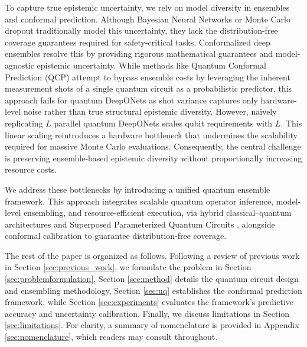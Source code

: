\documentclass{iopjournal}
\begin{document}
To capture true epistemic uncertainty, we rely on model diversity in ensembles and conformal prediction. Although Bayesian Neural Networks \cite{neal1996bnn, goan2020bnn} or Monte Carlo dropout \cite{gal2016dropout} traditionally model this uncertainty, they lack the distribution-free coverage guarantees required for safety-critical tasks. Conformalized deep ensembles \cite{angelopoulous2023conformal, moya2025conformal} resolve this by providing rigorous mathematical guarantees and model-agnostic epistemic uncertainty. While methods like Quantum Conformal Prediction (QCP) \cite{park2023qcp} attempt to bypass ensemble costs by leveraging the inherent measurement shots of a single quantum circuit as a probabilistic predictor, this approach fails for quantum DeepONets as shot variance captures only hardware-level noise rather than true structural epistemic diversity. However, naïvely replicating $L$ parallel quantum DeepONets scales qubit requirements with $L$. This linear scaling reintroduces a hardware bottleneck that undermines the scalability required for massive Monte Carlo evaluations. Consequently, the central challenge is preserving ensemble-based epistemic diversity without proportionally increasing resource costs.

We address these bottlenecks by introducing a unified quantum ensemble framework. This approach integrates scalable quantum operator inference, model-level ensembling, and resource-efficient execution, via hybrid classical–quantum architectures and Superposed Parameterized Quantum Circuits \cite{patapovich2025spqc}, alongside conformal calibration to guarantee distribution-free coverage. 

The rest of the paper is organized as follows. Following a review of previous work in Section \ref{sec:previous_work}, we formulate the problem in Section \ref{sec:problemformulation}, Section \ref{sec:method} details the quantum circuit design and ensembling methodology, Section \ref{sec:uq} establishes the conformal prediction framework, while Section \ref{sec:experiments} evaluates the framework's predictive accuracy and uncertainty calibration. Finally, we discuss limitations in Section \ref{sec:limitations}. For clarity, a summary of nomenclature is provided in Appendix \ref{sec:nomenclature}, which readers may consult throughout.
\end{document}
